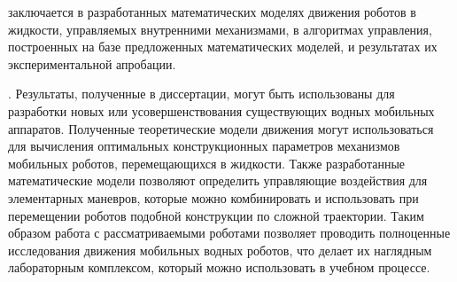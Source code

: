 {\novelty} заключается в разработанных математических моделях движения роботов в жидкости, управляемых внутренними механизмами, в алгоритмах управления, построенных на базе предложенных математических моделей, и результатах их экспериментальной апробации.

{\influence}. Результаты, полученные в диссертации, могут быть использованы для разработки новых или усовершенствования существующих водных мобильных аппаратов. Полученные теоретические модели движения могут использоваться для вычисления оптимальных конструкционных параметров механизмов мобильных роботов, перемещающихся в жидкости. Также разработанные математические модели позволяют определить управляющие воздействия для элементарных маневров, которые можно комбинировать и использовать при перемещении роботов подобной конструкции по сложной траектории. Таким образом работа с рассматриваемыми роботами позволяет проводить полноценные исследования движения мобильных водных роботов, что делает их наглядным лабораторным комплексом, который можно использовать в учебном процессе.

